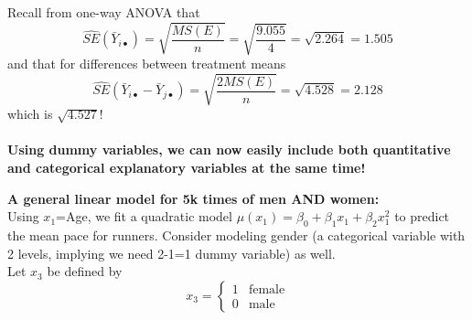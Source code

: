 Recall from one-way ANOVA that 
$$\widehat{SE}(\bar{Y}_{i\bullet}) = \sqrt{\frac{MS(E)}{n}} = \sqrt{\frac{9.055}{4}} = \sqrt{2.264} = 1.505$$
and that for differences between treatment means 
$$\widehat{SE}(\bar{Y}_{i\bullet}-\bar{Y}_{j\bullet})=\sqrt{\frac{2MS(E)}{n}}=\sqrt{4.528} = 2.128$$
which is $\sqrt{4.527}$!
~\\~\\

\textbf{Using dummy variables, we can now easily include both quantitative and categorical explanatory variables at the same time!}

\newpage

\Large\textbf{A general linear model for 5k times of men AND women:}\large\\
Using $x_1$=Age, we fit a quadratic model $\mu(x_1) = \beta_0 + \beta_1 x_1 + \beta_2 x_1^2$ to predict the mean pace for runners.  Consider modeling gender (a categorical variable with 2 levels, implying we need 2-1=1 dummy variable) as well.\\

Let $x_3$ be defined by  
\[
x_3 = 
\begin{cases} 
1 & \text{female} \\ 0 & \text{male} 
\end{cases}
\]~\\

